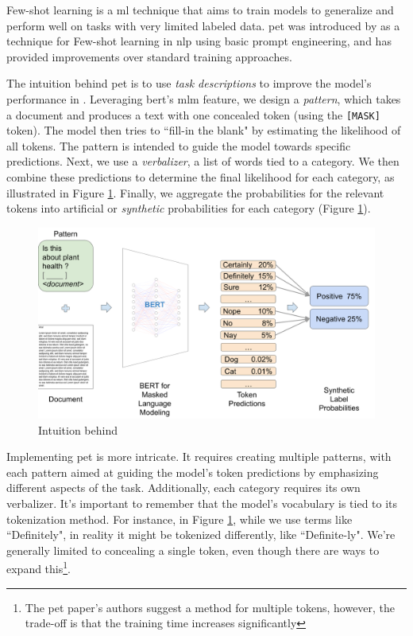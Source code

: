 \label{06_pet}

Few-shot learning is a \gls{ml} technique that aims to train models to generalize and perform well on tasks with very limited labeled data.
\gls{pet} was introduced by  as a technique for Few-shot learning in \gls{nlp} using basic prompt engineering, and has provided improvements over standard training approaches.



The intuition behind \gls{pet} is to use \emph{task descriptions} to improve the model's performance in \textclassification{}. 
Leveraging \gls{bert}'s \gls{mlm} feature, 
we design a \emph{pattern}, which takes a document and produces a text with one concealed token (using the \texttt{[MASK]} token).
The model then tries to ``fill-in the blank" by estimating the likelihood of all tokens.
The pattern is intended to guide the model towards specific predictions. 
Next, we use a \emph{verbalizer}, a list of words tied to a category. 
We then combine these predictions to determine the final likelihood for each category, as illustrated in Figure \ref{fig:06_pet_intuition}.
Finally, we aggregate the probabilities for the relevant tokens into artificial or \emph{synthetic} probabilities for each category (Figure \ref{fig:06_pet_intuition}).

\begin{figure}
    \centering
    \includegraphics[width=\textwidth]{Figures/06/06_pet_intuition.png}
    \caption{Intuition behind \PET{}}
    \label{fig:06_pet_intuition}
\end{figure}


Implementing \gls{pet} is more intricate. It requires creating multiple patterns, with each pattern aimed at guiding the model's token predictions by emphasizing different aspects of the task. Additionally, each category requires its own verbalizer. It's important to remember that the model's vocabulary is tied to its tokenization method. For instance, in Figure \ref{fig:06_pet_intuition}, while we use terms like ``Definitely", in reality it might be tokenized differently, like ``Definite-ly". We're generally limited to concealing a single token, even though there are ways to expand this\footnote{The \gls{pet} paper's authors suggest a method for multiple tokens, however, the trade-off is that the training time increases significantly}.



